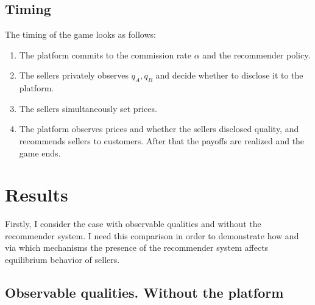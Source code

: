 \documentclass[a4paper]{article}
\begin{document}
	\subsection{Timing}
	The timing of the game looks as follows:
	\begin{enumerate}
		\item The platform commits to the commission rate $\alpha$ and the recommender policy.
		\item The sellers privately observes $q_A, q_B$ and decide whether to disclose it to the platform.
		\item The sellers simultaneously set prices.
		\item The platform observes prices and whether the sellers disclosed quality, and recommends sellers to customers. After that the payoffs are realized and the game ends.
	\end{enumerate}

	\section{Results}
	Firstly, I consider the case with observable qualities and without the recommender system. I need this comparison in order to demonstrate how and via which mechanisms the presence of the recommender system affects equilibrium behavior of sellers.
	
	
	\subsection{Observable qualities. Without the platform}
\end{document}
